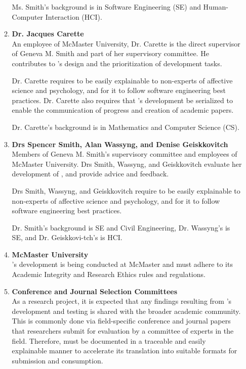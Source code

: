 \begin{itemize}
\begin{enumerate}
        Ms. Smith's background is in Software Engineering (SE) and
        Human-Computer Interaction (HCI).

        \item \textbf{Dr. Jacques Carette} \\
        An employee of McMaster University, Dr. Carette is the direct
        supervisor of Geneva M. Smith and part of her supervisory committee. He
        contributes to \progname{}'s design and the prioritization of
        development tasks.

        Dr. Carette requires \progname{} to be easily explainable to
        non-experts of affective science and psychology, and for it to follow
        software engineering best practices. Dr. Carette also requires that
        \progname{}'s development be serialized to enable the communication of
        progress and creation of academic papers.

        Dr. Carette's background is in Mathematics and Computer Science (CS).

        \item \textbf{Drs Spencer Smith, Alan Wassyng, and Denise Geiskkovitch}
        \\
        Members of Geneva M. Smith's supervisory committee and employees of
        McMaster University. Drs Smith, Wassyng, and Geiskkovitch evaluate her
        development of \progname{}, and provide advice and feedback.

        Drs Smith, Wassyng, and Geiskkovitch require \progname{} to be easily
        explainable to non-experts of affective science and psychology, and for
        it to follow software engineering best practices.

        Dr. Smith's background is SE and Civil Engineering, Dr. Wassyng's is
        SE, and Dr. Geiskkovi-tch's is HCI.

        \item \textbf{McMaster University} \\
        \progname{}'s development is being conducted at McMaster and must
        adhere to its Academic Integrity and Research Ethics rules and
        regulations.

        \item \textbf{Conference and Journal Selection Committees} \\
        As a research project, it is expected that any findings resulting from
        \progname{}'s development and testing is shared with the broader
        academic community. This is commonly done via field-specific conference
        and journal papers that researchers submit for evaluation by a
        committee of experts in the field. Therefore, \progname{} must be
        documented in a traceable and easily explainable manner to accelerate
        its translation into suitable formats for submission and consumption.


\end{enumerate}
\end{itemize}

